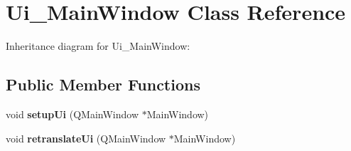 \hypertarget{classUi__MainWindow}{}\section{Ui\+\_\+\+Main\+Window Class Reference}
\label{classUi__MainWindow}


Inheritance diagram for Ui\+\_\+\+Main\+Window\+:
\subsection*{Public Member Functions}
\begin{DoxyCompactItemize}
\item 
\mbox{\label{classUi__MainWindow_acf4a0872c4c77d8f43a2ec66ed849b58}} 
void {\bfseries setup\+Ui} (Q\+Main\+Window $\ast$Main\+Window)
\item 
\mbox{\label{classUi__MainWindow_a097dd160c3534a204904cb374412c618}} 
void {\bfseries retranslate\+Ui} (Q\+Main\+Window $\ast$Main\+Window)
\end{DoxyCompactItemize}
